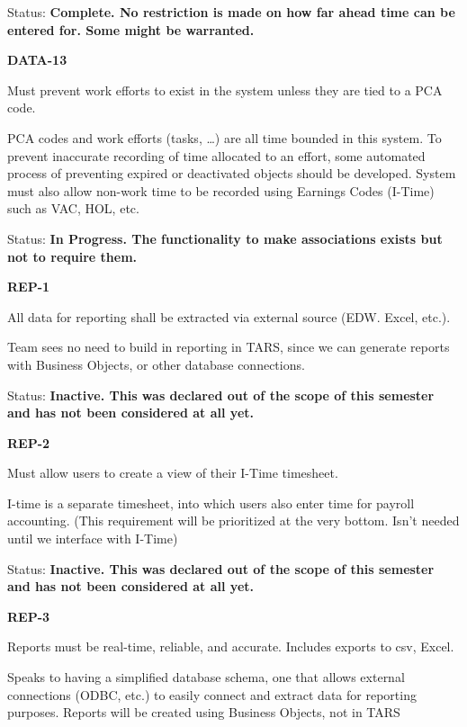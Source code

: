 \documentclass{article}
\begin{document}
Status: \textbf{Complete.  No restriction is made on how far ahead time can be entered for.  Some  might be warranted.}

\noindent 

\noindent \textbf{DATA-13}

\noindent Must prevent work efforts to exist in the system unless they are tied to a PCA code.

\noindent PCA codes and work efforts (tasks, \dots ) are all time bounded in this system. To prevent inaccurate recording of time allocated to an effort, some automated process of preventing expired or deactivated objects should be developed. System must also allow non-work time to be recorded using Earnings Codes (I-Time) such as VAC, HOL, etc.

\noindent Status: \textbf{In Progress.  The functionality to make associations exists but not to require them.}

\noindent 

\noindent \textbf{REP-1}

\noindent All data for reporting shall be extracted via external source (EDW. Excel, etc.).

\noindent Team sees no need to build in reporting in TARS, since we can generate reports with Business Objects, or other database connections. 

\noindent Status: \textbf{Inactive.   This was declared out of the scope of this semester and has not been considered at all yet.}

\noindent 

\noindent \textbf{REP-2}

\noindent Must allow users to create a view of their I-Time timesheet.

I-time is a separate timesheet, into which users also enter time for payroll accounting. (This requirement will be prioritized at the very bottom.  Isn't needed until we interface with I-Time)

\noindent Status: \textbf{Inactive.   This was declared out of the scope of this semester and has not been considered at all yet.}

  

\noindent \textbf{REP-3}

\noindent Reports must be real-time, reliable, and accurate. Includes exports to csv, Excel.

\noindent Speaks to having a simplified database schema, one that allows external connections (ODBC, etc.) to easily connect and extract data for reporting purposes. Reports will be created using Business Objects, not in TARS
\end{document}
